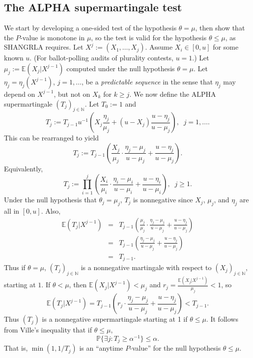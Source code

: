 \documentclass[aoas]{imsart}
\newcommand{\EE}{\mathbb{E}}
\renewcommand{\Pr}{\mathbb{P}}
\begin{document}
\subsection{The ALPHA supermartingale test}

We start by developing a one-sided test of the hypothesis $\theta = \mu$, then show that the $P$-value is monotone in
$\mu$, so the test is valid for the hypothesis $\theta \le \mu$, as SHANGRLA requires.
Let $X^j := (X_1, \ldots, X_j)$.
Assume $X_i \in [0, u]$ for some known $u$. 
(For ballot-polling audits of plurality contests, $u=1$.)
Let $\mu_j := \EE(X_j | X^{j-1})$ computed under the null hypothesis $\theta = \mu$. 
Let $\eta_j = \eta_j(X^{j-1})$, $j=1, \ldots$, be a \emph{predictable sequence} in the sense that 
$\eta_j$ may depend on $X^{j-1}$, but not on $X_k$ for $k \ge j$.
We now define the ALPHA supermartingale $(T_j)_{j \in \mathbb{N}}$.
Let $T_0 := 1$ and
\begin{equation}
    T_j := T_{j-1} u^{-1}\left ( X_j\frac{\eta_j}{\mu_j} + (u-X_j) \frac{u-\eta_j}{u-\mu_j} \right ), \;\; j=1, \ldots . \label{eq:alphaBRAVOdef}
\end{equation}
This can be rearranged to yield
\begin{equation}
    T_j := T_{j-1} \left ( \frac{X_j}{\mu_j} \cdot \frac{\eta_j-\mu_j}{u-\mu_j} + \frac{u-\eta_j}{u-\mu_j} \right ). \label{eq:alphaMult}
\end{equation}
Equivalently,
\begin{equation}
    T_j := \prod_{i=1}^j \left ( \frac{X_i}{\mu_i} \cdot \frac{\eta_i-\mu_i}{u-\mu_i} + \frac{u-\eta_i}{u-\mu_i} \right ), \;\; j \ge 1. \label{eq:alphaMultProd}
\end{equation}
Under the null hypothesis that $\theta_j = \mu_j$, $T_j$ is nonnegative since $X_j$, $\mu_j$, and $\eta_j$
are all in $[0, u]$.
Also,
\begin{eqnarray}
    \EE (T_j | X^{j-1} ) &=& T_{j-1} \left ( \frac{\mu_j}{\mu_j} \cdot \frac{\eta_j-\mu_j}{u-\mu_j} + \frac{u-\eta_j}{u-\mu_j} \right ) \nonumber \\
    &=&  T_{j-1} \left ( \frac{\eta_j-\mu_j}{u-\mu_j} + \frac{u-\eta_j}{u-\mu_j} \right ) \nonumber \\
    &=& T_{j-1}.
\end{eqnarray}
Thus if $\theta = \mu$, $(T_j)_{j \in \mathbb{N}}$ is a nonnegative martingale with respect to $(X_j)_{j \in \mathbb{N}}$, starting at $1$.
If $\theta < \mu$, then $\EE (X_j | X^{j-1}) < \mu_j$ and $r_j = \frac{\EE (X_j | X^{j-1})}{\mu_j} < 1$, so
\begin{equation} \label{eq:supermartingale}
    \EE (T_j | X^{j-1} ) = T_{j-1} \left ( r_j \cdot \frac{\eta_j-\mu_j}{u-\mu_j} + \frac{u-\eta_j}{u-\mu_j} \right ) < T_{j-1}.
\end{equation}
Thus $(T_j)$ is a nonnegative supermartingale starting at 1 if $\theta \le \mu$.
It follows from Ville's inequality \citep{ville39} that if $\theta \le \mu$,
\begin{equation} \label{eq:p-value-adapt}
\Pr \{ \exists j :  T_j \ge \alpha^{-1} \} \le \alpha.
\end{equation}
That is, $\min(1, 1/T_j)$ is an ``anytime $P$-value'' for the null hypothesis $\theta \le \mu$.
\end{document}

